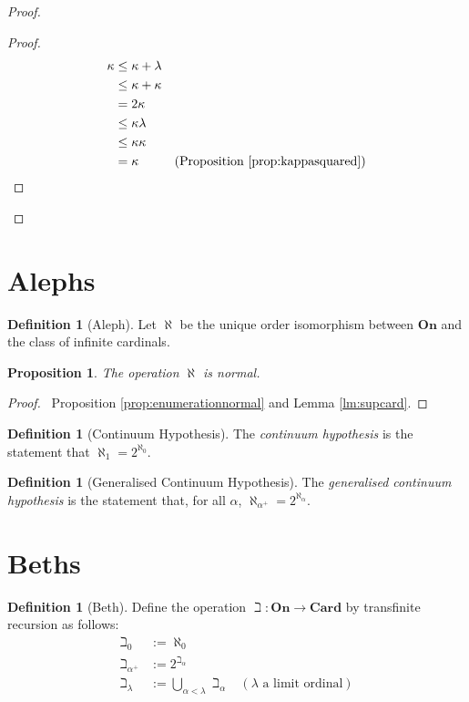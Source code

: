 \documentclass{book}
\let\qed\relax
\newtheorem{prop}[ax]{Proposition}
\theoremstyle{definition}
\newtheorem{df}[ax]{Definition}
\begin{document}
\begin{proof}
\pf
{}
\begin{proof}
	\pf
	\begin{align*}
		\kappa & \leq \kappa + \lambda \\
		& \leq \kappa + \kappa \\
		& = 2 \kappa \\
		& \leq \kappa \lambda \\
		& \leq \kappa \kappa \\
		& = \kappa & (\text{Proposition \ref{prop:kappasquared}})
	\end{align*}
\end{proof}
\qed
\end{proof}

\section{Alephs}

\begin{df}[Aleph]
Let $\aleph$ be the unique order isomorphism between $\mathbf{On}$ and the class of infinite cardinals.
\end{df}

\begin{prop}
The operation $\aleph$ is normal.
\end{prop}

\begin{proof}
\pf\ Proposition \ref{prop:enumerationnormal} and Lemma \ref{lm:supcard}. \qed
\end{proof}

\begin{df}[Continuum Hypothesis]
The \emph{continuum hypothesis} is the statement that $\aleph_1 = 2^{\aleph_0}$.
\end{df}

\begin{df}[Generalised Continuum Hypothesis]
The \emph{generalised continuum hypothesis} is the statement that, for all $\alpha$, $\aleph_{\alpha^+} = 2^{\aleph_\alpha}$.
\end{df}

\section{Beths}

\begin{df}[Beth]
Define the operation $\beth : \mathbf{On} \rightarrow \mathbf{Card}$ by transfinite recursion as follows:
\begin{align*}
\beth_0 & := \aleph_0 \\
\beth_{\alpha^+} & := 2^{\beth_\alpha} \\
\beth_\lambda & := \bigcup_{\alpha < \lambda} \beth_\alpha & (\lambda \text{ a limit ordinal})
\end{align*}
\end{df}
\end{document}
